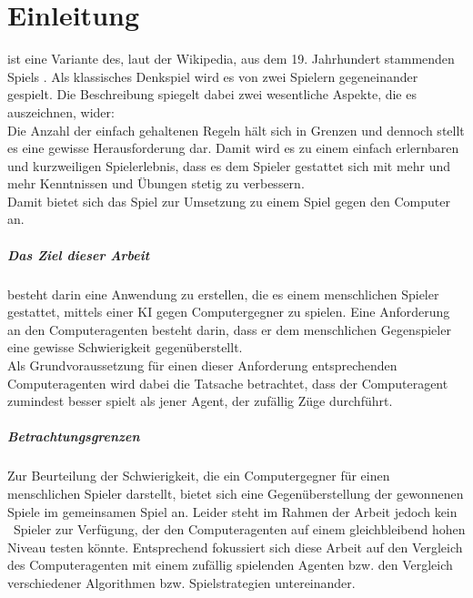 \chapter{Einleitung}
\authormax
\mxZitat{\ot} ist eine Variante des, laut der Wikipedia, aus dem 19. Jahrhundert stammenden Spiels  \cite{Wiki:EN:Reversi}. Als klassisches Denkspiel wird es von zwei Spielern gegeneinander gespielt. Die Beschreibung  \cite{Rose} spiegelt dabei zwei wesentliche Aspekte, die es auszeichnen, wider:
\\Die Anzahl der einfach gehaltenen Regeln hält sich in Grenzen und dennoch stellt es eine gewisse Herausforderung dar. Damit wird es zu einem einfach erlernbaren und kurzweiligen Spielerlebnis, dass es dem Spieler gestattet sich mit mehr und mehr Kenntnissen und Übungen stetig zu verbessern.
\\Damit bietet sich das Spiel zur Umsetzung zu einem Spiel gegen den Computer an.
\paragraph{Das Ziel dieser Arbeit} besteht darin eine Anwendung zu erstellen, die es einem menschlichen Spieler gestattet, mittels einer \ac{KI} gegen Computergegner \mxZitat{\ot} \linebreak zu spielen. Eine Anforderung an den Computeragenten besteht darin, dass er dem menschlichen Gegenspieler eine gewisse Schwierigkeit gegenüberstellt.
\\Als Grundvoraussetzung für einen dieser Anforderung entsprechenden Computeragenten wird dabei die Tatsache betrachtet, dass der Computeragent zumindest besser spielt als jener Agent, der zufällig Züge durchführt.
\paragraph{Betrachtungsgrenzen}
Zur Beurteilung der Schwierigkeit, die ein Computergegner für einen menschlichen Spieler darstellt, bietet sich eine Gegenüberstellung der gewonnenen Spiele im gemeinsamen Spiel an. Leider steht im Rahmen der Arbeit jedoch kein \ot\ Spieler zur Verfügung, der den Computeragenten auf einem gleichbleibend hohen Niveau testen könnte. Entsprechend fokussiert sich diese Arbeit auf den Vergleich des Computeragenten mit einem zufällig spielenden Agenten bzw. den Vergleich verschiedener Algorithmen bzw. Spielstrategien untereinander.
\newpage
